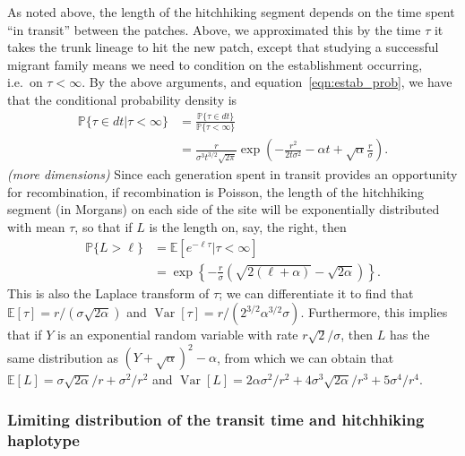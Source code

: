 \documentclass{article}
\DeclareMathOperator{\var}{Var}
\renewcommand{\P}{\mathbb{P}}
\newcommand{\E}{\mathbb{E}}
\newcommand{\plr}[1]{{\it\color{blue}(#1)}}
\begin{document}
As noted above, the length of the hitchhiking segment depends on the time
spent ``in transit'' between the patches.
Above, we approximated this by the time $\tau$ it takes the trunk lineage to hit the new patch,
except that studying a successful migrant family means we need to condition on the establishment occurring, i.e.\ on $\tau < \infty$.
By the above arguments, and equation~\eqref{eqn:estab_prob}, we have that the conditional probability density is
\begin{align}
  \P\{\tau\in dt | \tau<\infty \} &= \frac{\P\{\tau \in dt\}}{\P\{\tau<\infty\}} \\
  &= \frac{r}{\sigma^3 t^{3/2}\sqrt{2\pi}} \exp\left(-\frac{r^2}{2t\sigma^2} -\alpha t + \sqrt{\alpha} \frac{r}{\sigma} \right) .
\end{align}
\plr{more dimensions}
Since each generation spent in transit provides an opportunity for recombination,
if recombination is Poisson, the length of the hitchhiking segment (in Morgans) on each side of the site will be exponentially distributed
with mean $\tau$, so that if $L$ is the length on, say, the right, then
\begin{align} \label{eqn:haplen_cdf}
\P\{L>\ell\} &= \E[e^{-\ell \tau}|\tau<\infty] \\
  &= \exp\left\{{-\frac{r}{\sigma}\left(\sqrt{2(\ell+\alpha)} - \sqrt{2\alpha}\right)}\right\} .
\end{align}
This is also the Laplace transform of $\tau$;
we can differentiate it to find that $\E[\tau] = r/(\sigma\sqrt{2\alpha})$
and $\var[\tau] = r/( 2^{3/2}\alpha^{3/2}\sigma)$.
Furthermore, this implies that if $Y$ is an exponential random variable with rate $r\sqrt{2}/\sigma$,
then $L$ has the same distribution as $(Y + \sqrt{\alpha})^2 - \alpha$,
from which we can obtain that
$\E[L] = \sigma \sqrt{2\alpha}/r + \sigma^2/r^2$ and $\var[L] = 2\alpha\sigma^2/r^2 + 4 \sigma^3 \sqrt{2\alpha}/r^3 + 5 \sigma^4 / r^4$.

\subsubsection{Limiting distribution of the transit time and hitchhiking haplotype}
\end{document}
